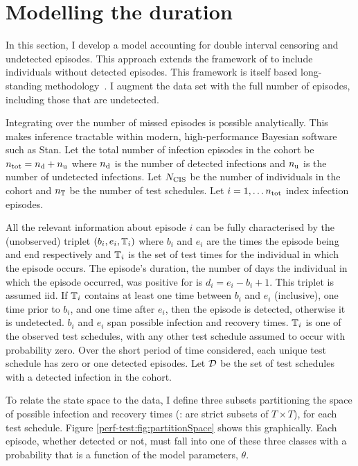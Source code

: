 \documentclass[thesis.tex]{subfiles}
\begin{document}
\section{Modelling the duration}\label{perf-test:sec:model}

In this section, I develop a model accounting for double interval censoring and undetected episodes.
This approach extends the framework of \textcite{heiseyModelling} to include individuals without detected episodes.
This framework is itself based long-standing methodology~\autocite{dempsterMaximum,turnbullEmpirical}.
I augment the data set with the full number of episodes, including those that are undetected.

Integrating over the number of missed episodes is possible analytically.
This makes inference tractable within modern, high-performance Bayesian software such as Stan.
Let the total number of infection episodes in the cohort be $n_\text{tot} = n_\text{d} + n_\text{u}$ where $n_\text{d}$ is the number of detected infections and $n_\text{u}$ is the number of undetected infections.
Let $N_\text{CIS}$ be the number of individuals in the cohort and $n_{\mathbb{T}}$ be the number of test schedules.
Let $i = 1, \dots n_\text{tot}$ index infection episodes.

All the relevant information about episode $i$ can be fully characterised by the (unobserved) triplet $(b_i, e_i, \mathbb{T}_i)$ where $b_i$ and $e_i$ are the times the episode being and end respectively and $\mathbb{T}_i$ is the set of test times for the individual in which the episode occurs.
The episode's duration, the number of days the individual in which the episode occurred, was positive for is $d_i = e_i - b_i + 1$.
This triplet is assumed iid.
If $\mathbb{T}_i$ contains at least one time between $b_i$ and $e_i$ (inclusive), one time prior to $b_i$, and one time after $e_i$, then the episode is detected, otherwise it is undetected.
$b_i$ and $e_i$ span possible infection and recovery times.
$\mathbb{T}_i$ is one of the observed test schedules, with any other test schedule assumed to occur with probability zero.
Over the short period of time considered, each unique test schedule has zero or one detected episodes.
Let $\mathcal{D}$ be the set of test schedules with a detected infection in the cohort.

To relate the state space to the data, I define three subsets partitioning the space of possible infection and recovery times (\ie: are strict subsets of $T \times T$), for each test schedule.
Figure \ref{perf-test:fig:partitionSpace} shows this graphically.
Each episode, whether detected or not, must fall into one of these three classes with a probability that is a function of the model parameters, $\theta$.
\end{document}
